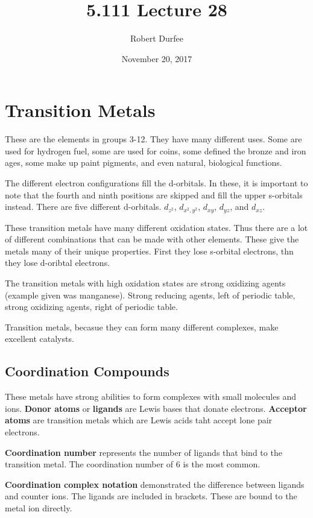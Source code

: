 \documentclass{article}
\title{ 5.111 Lecture 28 }
\author{ Robert Durfee }
\date{ November 20, 2017 }
\begin{document}
\maketitle

\section{ Transition Metals }

These are the elements in groups 3-12. They have many different uses. Some are
used for hydrogen fuel, some are used for coins, some defined the bronze and
iron ages, some make up paint pigments, and even natural, biological functions. 

The different electron configurations fill the d-orbitals. In these, it is
important to note that the fourth and ninth positions are skipped and fill the
upper s-orbitals instead. There are five different d-orbitals. $d_{z^2}$,
$d_{x^2,y^2}$, $d_{xy}$, $d_{yz}$, and $d_{xz}$.

These transition metals have many different oxidation states. Thus there are a
lot of different combinations that can be made with other elements. These give
the metals many of their unique properties. First they lose s-orbital electrons,
thn they lose d-oribtal electrons.

The transition metals with high oxidation states are strong oxidizing agents
(example given was manganese). Strong reducing agents, left of periodic table,
strong oxidizing agents, right of periodic table. 

Transition metals, becasue they can form many different complexes, make
excellent catalysts. 

\subsection{Coordination Compounds} 

These metals have strong abilities to form complexes with small molecules and
ions. \textbf{Donor atoms} or \textbf{ligands} are Lewis bases that donate
electrons. \textbf{Acceptor atoms} are transition metals which are Lewis acids
taht accept lone pair electrons.

\textbf{Coordination number} represents the number of ligands that bind to the
transition metal. The coordination number of 6 is the most common.

\textbf{Coordination complex notation} demonstrated the difference between
ligands and counter ions. The ligands are included in brackets. These are bound
to the metal ion directly.
\end{document}
